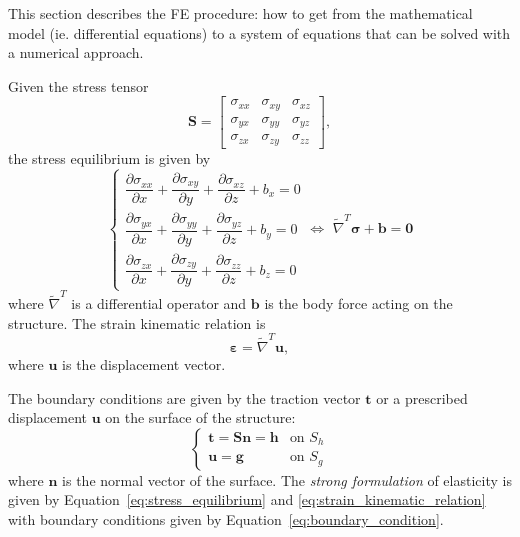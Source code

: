 This section describes the FE procedure: how to get from the mathematical model (ie. differential equations) to a system of equations that can be solved with a numerical approach.

Given the stress tensor
\begin{equation}
\label{eq:stress_tensor}
	\mathbf{S} = 
	\begin{bmatrix}
	\sigma_{xx} & \sigma_{xy} & \sigma_{xz} \\
	\sigma_{yx} & \sigma_{yy} & \sigma_{yz} \\
	\sigma_{zx} & \sigma_{zy} & \sigma_{zz}
	\end{bmatrix},
\end{equation}
the stress equilibrium is given by
\begin{equation}
\label{eq:stress_equilibrium}
	\begin{cases}
		\dfrac{\partial \sigma_{xx}}{\partial x} + \dfrac{\partial \sigma_{xy}}{\partial y} + \dfrac{\partial \sigma_{xz}}{\partial z} + b_x = 0 \\
		\dfrac{\partial \sigma_{yx}}{\partial x} + \dfrac{\partial \sigma_{yy}}{\partial y} + \dfrac{\partial \sigma_{yz}}{\partial z} + b_y = 0 \\
		\dfrac{\partial \sigma_{zx}}{\partial x} + \dfrac{\partial \sigma_{zy}}{\partial y} + \dfrac{\partial \sigma_{zz}}{\partial z} + b_z = 0
	\end{cases}
	\Leftrightarrow
	\,\, \widetilde{\nabla}^T \bm{\sigma} + \mathbf{b} = \mathbf{0}
\end{equation}
where $\widetilde{\nabla}^T$ is a differential operator and $\mathbf{b}$ is the body force acting on the structure. The strain kinematic relation is
\begin{equation}
\label{eq:strain_kinematic_relation}
 	\bm{\varepsilon} = \widetilde{\nabla}^T \mathbf{u},
\end{equation} 
where $\mathbf{u}$ is the displacement vector.

The boundary conditions are given by the traction vector $\mathbf{t}$ or a prescribed displacement $\mathbf{u}$ on the surface of the structure:
\begin{equation}
\label{eq:boundary_condition}
	\begin{cases}
 		\mathbf{t} = \mathbf{S}\mathbf{n} = \mathbf{h} & \text{on $S_h$} \\
		\mathbf{u} = \mathbf{g} & \text{on $S_g$}
	\end{cases}
\end{equation}
where $\mathbf{n}$ is the normal vector of the surface. The \textit{strong formulation} of elasticity is given by Equation~\eqref{eq:stress_equilibrium} and \eqref{eq:strain_kinematic_relation} with boundary conditions given by Equation~\eqref{eq:boundary_condition}.

